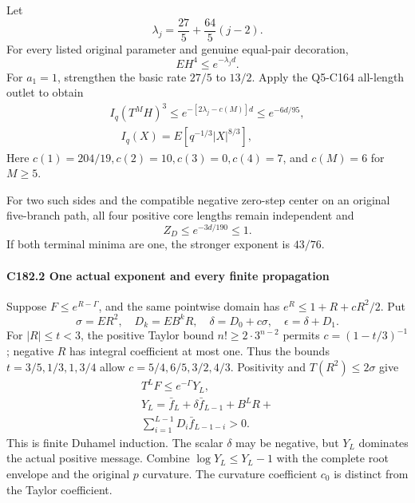 Let
\[
 \lambda_j=\frac{27}{5}+\frac{64}{5}(j-2).
\]
For every listed original parameter and genuine equal-pair decoration,
\[
 \boxed{EH^4\le e^{-\lambda_jd}.}                       \tag{C182.3}
\]
For \(a_1=1\), strengthen the basic rate \(27/5\) to \(13/2\). Apply the Q5-C164 all-length outlet to obtain
\[
\begin{gathered}
I_q(T^MH)^3\le e^{-[2\lambda_j-c(M)]d}\le e^{-6d/95},\\
\quad I_q(X)=E[q^{-1/3}|X|^{8/3}],
\end{gathered}\tag{C182.4}
\]
Here \(c(1)=204/19,\allowbreak \allowbreak  c(2)=10,\allowbreak \allowbreak  c(3)=0,\allowbreak \allowbreak  c(4)=7\), and \(c(M)=6\) for \(M\ge5\).

For two such sides and the compatible negative zero-step center on an original five-branch path, all four positive core lengths remain independent and
\[
 \boxed{Z_D\le e^{-3d/190}\le1.}                       \tag{C182.5}
\]
If both terminal minima are one, the stronger exponent is \(43/76\).

\paragraph{C182.2 One actual exponent and every finite propagation}

Suppose \(F\le e^{R-\Gamma}\), and the same pointwise domain has \(e^R\le1+R+cR^2/2\). Put
\[
 \sigma=ER^2,\quad D_k=EB^kR,\quad
 \delta=D_0+c\sigma,\quad\epsilon=\delta+D_1.
\]
For \(|R|\le t<3\), the positive Taylor bound \(n!\ge2\cdot3^{n-2}\) permits \(c=(1-t/3)^{-1}\); negative \(R\) has integral coefficient at most one. Thus the bounds \(t=3/5,\allowbreak \allowbreak  1/3,\allowbreak \allowbreak  1,\allowbreak \allowbreak  3/4\) allow \(c=5/4,\allowbreak \allowbreak  6/5,\allowbreak \allowbreak  3/2,\allowbreak \allowbreak  4/3\). Positivity and \(T(R^2)\le2\sigma\) give
\[
\begin{gathered}
T^LF\le e^{-\Gamma}Y_L,\quad\\
Y_L=\bar f_L+\delta \bar f_{L-1}+B^LR+\\
\sum_{i=1}^{L-1}D_i \bar f_{L-1-i}>0.
\end{gathered}\tag{C182.14}
\]
This is finite Duhamel induction. The scalar \(\delta\) may be negative, but \(Y_L\) dominates the actual positive message. Combine \(\log Y_L\le Y_L-1\) with the complete root envelope and the original \(p\) curvature. The curvature coefficient \(c_0\) is distinct from the Taylor coefficient.

